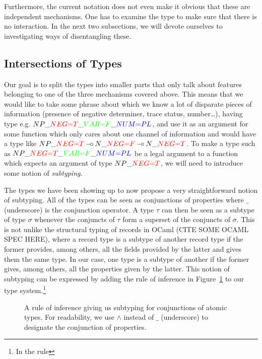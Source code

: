 Furthermore, the current notation does not even make it obvious that
these are independent mechanisms. One has to examine the type to make
sure that there is no interaction. In the next two subsections, we will
devote ourselves to investigating ways of disentangling these.


\subsection{Intersections of Types}

Our goal is to split the types into smaller parts that only talk about
features belonging to one of the three mechanisms covered above. This
means that we would like to take some phrase about which we know a lot
of disparate pieces of information (presence of negative determiner,
trace status, number\ldots), having type
e.g. $NP\_\textcolor{red}{NEG{=}T}\_\textcolor{green}{VAR{=}F}\_\textcolor{blue}{NUM{=}PL}$,
and use it as an argument for some function which only cares about one
channel of information and would have a type like
$NP\_\textcolor{red}{NEG{=}T} \limp N\_\textcolor{red}{NEG{=}F} \limp
N\_\textcolor{red}{NEG{=}T}$. To make a type such as
$NP\_\textcolor{red}{NEG{=}T}\_\textcolor{green}{VAR{=}F}\_\textcolor{blue}{NUM{=}PL}$
be a legal argument to a function which expects an argument of type
$NP\_\textcolor{red}{NEG{=}T}$, we will need to introduce some notion of
\emph{subtyping}.

The types we have been showing up to now propose a very straightforward
notion of subtyping. All of the types can be seen as conjunctions of
properties where $\_$ (underscore) is the conjunction operator. A type
$\tau$ can then be seen as a subtype of type $\sigma$ whenever the
conjuncts of $\tau$ form a superset of the conjuncts of $\sigma$. This
is not unlike the structural typing of records in OCaml (CITE SOME OCAML
SPEC HERE), where a record type is a subtype of another record type if
the former provides, among others, all the fields provided by the latter
and gives them the same type. In our case, one type is a subtype of
another if the former gives, among others, all the properties given by
the latter. This notion of subtyping can be expressed by adding the rule
of inference in Figure~\ref{fig:type-superset} to our type
system.\footnote{In the rule }

\begin{figure}
  \begin{prooftree}
  \end{prooftree}
  \caption{\label{fig:type-superset} A rule of inference giving us
    subtyping for conjunctions of atomic types. For readability, we use
    $\land$ instead of $\_$ (underscore) to designate the conjunction of
    properties.}
\end{figure}

